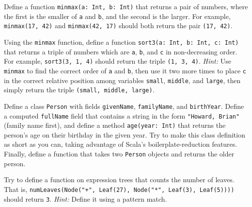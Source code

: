 \begin{exercises}
\item Define a function \verb|minmax(a: Int, b: Int)| that returns a pair of numbers, where the first is the smaller of \texttt{a} and \texttt{b}, and the second is the larger. For example, \verb|minmax(17, 42)| and \verb|minmax(42, 17)| should both return the pair \verb|(17, 42)|.

\item Using the \texttt{minmax} function, define a function \verb|sort3(a: Int, b: Int, c: Int)| that returns a triple of numbers which are \texttt{a}, \texttt{b}, and \texttt{c} in non-decreasing order. For example, \verb|sort3(3, 1, 4)| should return the triple \verb|(1, 3, 4)|. \textit{Hint:} Use \texttt{minmax} to find the correct order of \texttt{a} and \texttt{b}, then use it two more times to place \texttt{c} in the correct relative position among variables \texttt{small}, \texttt{middle}, and \texttt{large}, then simply return the triple \verb|(small, middle, large)|.

\item Define a class \texttt{Person} with fields \texttt{givenName}, \texttt{familyName}, and \texttt{birthYear}. Define a computed \texttt{fullName} field that contains a string in the form \verb|"Howard, Brian"| (family name first), and define a method \verb|age(year: Int)| that returns the person's age on their birthday in the given year. Try to make this class definition as short as you can, taking advantage of Scala's boilerplate-reduction features. Finally, define a function that takes two \texttt{Person} objects and returns the older person.

\item Try to define a function on expression trees that counts the number of leaves. That is, \verb|numLeaves(Node("+", Leaf(27), Node("*", Leaf(3), Leaf(5))))| should return \texttt{3}. \textit{Hint:} Define it using a pattern match.
\end{exercises}
